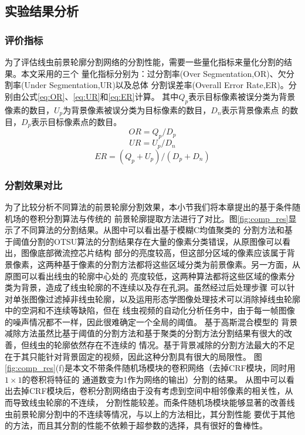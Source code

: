 \subsection{实验结果分析}
\subsubsection{评价指标}
	为了评估线虫前景轮廓分割网络的分割性能，需要一些量化指标来量化分割的结果。本文采用的三个
	量化指标分别为：过分割率(Over Segmentation,OR)、欠分割率(Under Segmentation,UR)以及总体
	分割误差率(Overall Error Rate,ER)\cite{Liu2006Set}。分别由公式\ref{eq:OR}、\ref{eq:UR}和\ref{eq:ER}计算。
	其中$Q_p$表示目标像素被误分类为背景像素的数目，$U_p$为背景像素被误分类为目标像素的数目，$D_n$表示背景像素点
	的数目，$D_p$表示目标像素点的数目。
		\begin{equation}
		OR = Q_p/D_p \label{eq:OR}
		\end{equation}
		\begin{equation}
		UR = U_p/D_n \label{eq:UR}
		\end{equation}
		\begin{equation}
		ER = (Q_p+U_p)/(D_p+D_n)\label{eq:ER}
		\end{equation}
\subsubsection{分割效果对比}
	为了比较分析不同算法的前景轮廓分割效果，本小节我们将本章提出的基于条件随机场的卷积分割算法与传统的
	前景轮廓提取方法进行了对比。图\ref{fig:comp_res}显示了不同算法的分割结果。从图中可以看出基于模糊C均值聚类的
	分割方法和基于阈值分割的OTSU算法的分割结果存在大量的像素分类错误，从原图像可以看出，图像底部微流控芯片结构
	部分的亮度较高，但这部分区域的像素应该属于背景像素，这两种基于像素的分割方法都将这些区域分类为前景像素。另一方面，从原图可以看出线虫的轮廓中心处的
	亮度较低，这两种算法都将这些区域的像素分类为背景，造成了线虫轮廓的不连续以及存在孔洞。虽然经过后处理步骤
	可以针对单张图像过滤掉非线虫轮廓，以及运用形态学图像处理技术可以消除掉线虫轮廓中的空洞和不连续等缺陷，但在
	线虫视频的自动化分析任务中，由于每一帧图像的噪声情况都不一样，因此很难确定一个全局的阈值。 基于高斯混合模型的
	背景减除方法虽然比基于阈值的分割方法和基于聚类的分割方法分割结果有很大的改善，但线虫的轮廓依然存在不连续的
	情况。基于背景减除的分割方法最大的不足在于其只能针对背景固定的视频，因此这种分割具有很大的局限性。
	图\ref{fig:comp_res}(f)是本文不带条件随机场模块的卷积网络（去掉CRF模块，同时用$1\times1$的卷积将特征的
	通道数变为1作为网络的输出）分割的结果。
	从图中可以看出去掉CRF模块后，卷积分割网络由于没有考虑到空间中相邻像素的相关性，从而导致线虫轮廓的不连续，
	分割性能较差。而条件随机场模块能够显著的改善线虫前景轮廓分割中的不连续等情况，与以上的方法相比，其分割性能
	要优于其他的方法，而且其分割的性能不依赖于超参数的选择，具有很好的鲁棒性。
	
